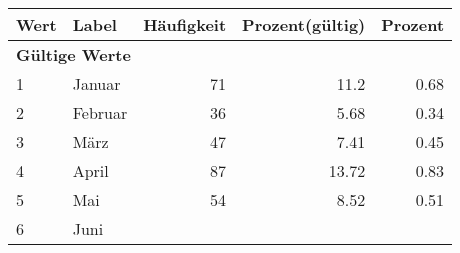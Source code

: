     \begin{longtable}{lXrrr}
     \toprule
     \textbf{Wert} & \textbf{Label} & \textbf{Häufigkeit} & \textbf{Prozent(gültig)} & \textbf{Prozent} \\
     \endhead
     \midrule
     \multicolumn{5}{l}{\textbf{Gültige Werte}}\\

     1 &
     \multicolumn{1}{X}{ Januar   } &


       \num{71} &
       \num[round-mode=places,round-precision=2]{11,2} &
         \num[round-mode=places,round-precision=2]{0,68} \\

     2 &
     \multicolumn{1}{X}{ Februar   } &


       \num{36} &
       \num[round-mode=places,round-precision=2]{5,68} &
         \num[round-mode=places,round-precision=2]{0,34} \\

     3 &
     \multicolumn{1}{X}{ März   } &


       \num{47} &
       \num[round-mode=places,round-precision=2]{7,41} &
         \num[round-mode=places,round-precision=2]{0,45} \\

     4 &
     \multicolumn{1}{X}{ April   } &


       \num{87} &
       \num[round-mode=places,round-precision=2]{13,72} &
         \num[round-mode=places,round-precision=2]{0,83} \\

     5 &
     \multicolumn{1}{X}{ Mai   } &


       \num{54} &
       \num[round-mode=places,round-precision=2]{8,52} &
         \num[round-mode=places,round-precision=2]{0,51} \\

     6 &
     \multicolumn{1}{X}{ Juni   } &



\end{longtable}
